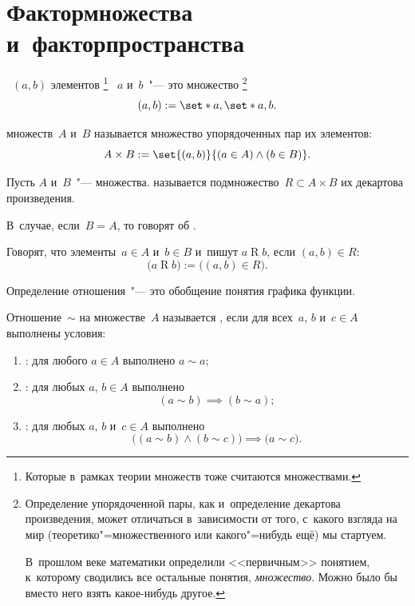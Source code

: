 \section{Фактормножества и~факторпространства}

	\begin{definition}
		\label{def:pair}
		~$(a, b)$ элементов%
		\footnote{Которые в~рамках теории множеств тоже считаются множествами.}%
		~$a$ и~$b$~"--- это множество
		\footnote{%
			Определение упорядоченной пары, как и~определение декартова
			произведения, может отличаться в~зависимости от того, с~какого взгляда
			на мир (теоретико"=множественного или какого"=нибудь ещё) мы стартуем.

			В~прошлом веке математики определили <<первичным>> понятием, к~которому
			сводились все остальные понятия, \emph{множество}. Можно было бы вместо
			него взять какое-нибудь другое.
		}%
		\[
			(a, b) := \set*{a, \set*{a, b}}
			.
		\]
	\end{definition}
	

	\begin{definition}
		\label{def:Decartes_product}
		 множеств~$A$ и~$B$ называется множество
		упорядоченных пар их элементов:
		\[
			A \times B :=
			\set{(a, b)}{(a \in A) \wedge (b \in B)}
			.
		\]
	\end{definition}

	\begin{definition}
		\label{def:relation}
		Пусть $A$ и~$B$~"--- множества.  называется подмножество~$R \subset A \times B$ их
		декартова произведения.

		В~случае, если~$B = A$, то говорят об \tdef{отношении на
		множестве~$A$}.

		Говорят, что элементы~$a \in A$ и~$b \in B$  и~пишут $a \mathrel{R} b$, если $(a, b) \in R$:
		\[
			\bigl(
				a \mathrel{R} b
			\bigr)
			:=
			\bigl(
				(a, b) \in R
			\bigr)
			.
		\]
	\end{definition}

	Определение отношения~"--- это обобщение понятия графика функции.

	\begin{definition}
		Отношение~$\sim$ на множестве~$A$ называется , если для всех~$a$, $b$ и~$c \in A$ выполнены условия:
		\begin{enumerate}[1)]
			\item {}: для любого $a \in A$ выполнено
				$a \sim a$;
			\item {}: для любых $a$, $b \in A$ выполнено
				\[
					(a \sim b) \implies (b \sim a);
				\]
			\item {}: для любых $a$, $b$ и~$c \in A$ выполнено
				\[
					\bigl(
						(a \sim b)
						\wedge
						(b \sim c)
					\bigr)
					\implies
					\bigl(
						a \sim c
					\bigr)
					.
				\]
		\end{enumerate}
	\end{definition}

